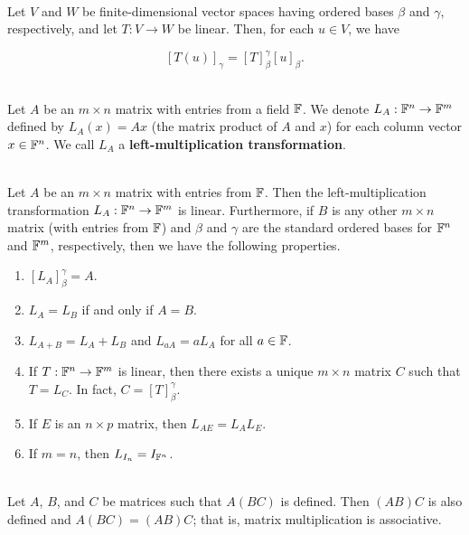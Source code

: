 \begin{theorem}
	\hfill\\
	Let $V$ and $W$ be finite-dimensional vector spaces having ordered bases $\beta$  and $\gamma$, respectively, and let $T: V \to W$ be linear. Then, for each $u \in V$, we have

	\[[T(u)]_\gamma = [T]_\beta^\gamma [u]_\beta.\]
\end{theorem}

\begin{definition}
	\hfill\\
	Let $A$ be an $m \times n$ matrix with entries from a field $\mathbb{F}$. We denote $L_A: \mathbb{F}^n \to \mathbb{F}^m$ defined by $L_A(x) = Ax$ (the matrix product of $A$ and $x$) for each column vector $x \in \mathbb{F}^n$. We call $L_A$ a \textbf{left-multiplication transformation}.
\end{definition}

\begin{theorem}
	\hfill\\
	Let $A$ be an $m \times n$ matrix with entries from $\mathbb{F}$. Then the left-multiplication transformation $L_A: \mathbb{F}^n \to \mathbb{F}^m$ is linear. Furthermore, if $B$ is any other $m \times n$ matrix (with entries from $\mathbb{F}$) and $\beta$ and $\gamma$ are the standard ordered bases for $\mathbb{F}^n$ and $\mathbb{F}^m$, respectively, then we have the following properties.

	\begin{enumerate}
		\item $[L_A]_\beta^\gamma = A$.
		\item $L_A = L_B$ if and only if $A = B$.
		\item $L_{A + B} = L_A + L_B$ and $L_{aA} = aL_A$ for all $a \in \mathbb{F}$.
		\item If $T: \mathbb{F}^n \to \mathbb{F}^m$ is linear, then there exists a unique $m \times n$ matrix $C$ such that $T = L_C$. In fact, $C = [T]_\beta^\gamma$.
		\item If $E$ is an $n \times p$ matrix, then $L_{AE} = L_AL_E$.
		\item If $m = n$, then $L_{I_n} = I_{\mathbb{F}^n}$.
	\end{enumerate}
\end{theorem}

\begin{theorem}
	\hfill\\
	Let $A$, $B$, and $C$ be matrices such that $A(BC)$ is defined. Then $(AB)C$ is also defined and $A(BC)=(AB)C$; that is, matrix multiplication is associative.
\end{theorem}

